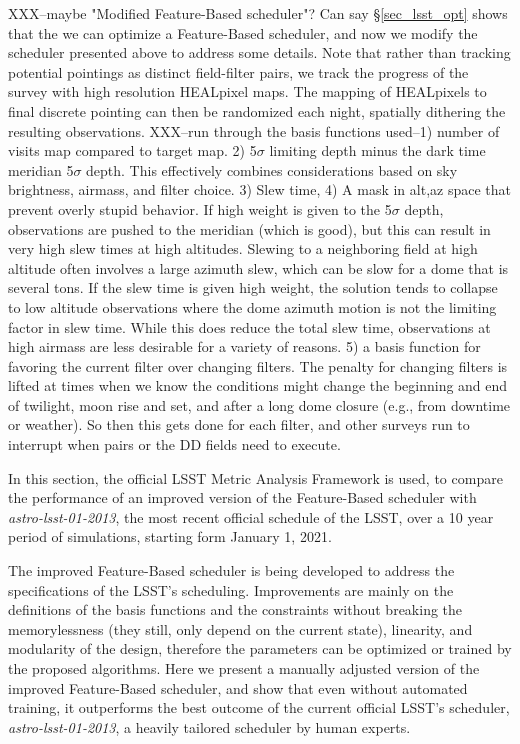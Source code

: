 \documentclass[12pt]{aastex62}
\theoremstyle{definition}
\begin{document}
XXX--maybe "Modified Feature-Based scheduler"? Can say \S\ref{sec_lsst_opt} shows that the we can optimize a Feature-Based scheduler, and now we modify the scheduler presented above to address some details.  Note that rather than tracking potential pointings as distinct field-filter pairs, we track the progress of the survey with high resolution HEALpixel maps. The mapping of HEALpixels to final discrete pointing can then be randomized each night, spatially dithering the resulting observations. 
XXX--run through the basis functions used--1) number of visits map compared to target map. 2) 5$\sigma$ limiting depth minus the dark time meridian 5$\sigma$ depth. This effectively combines considerations based on sky brightness, airmass, and filter choice. 3) Slew time, 4) A mask in alt,az space that prevent overly stupid behavior. If high weight is given to the 5$\sigma$ depth, observations are pushed to the meridian (which is good), but this can result in very high slew times at high altitudes. Slewing to a neighboring field at high altitude often involves a large azimuth slew, which can be slow for a dome that is several tons.  If the slew time is given high weight, the solution tends to collapse to low altitude observations where the dome azimuth motion is not the limiting factor in slew time. While this does reduce the total slew time, observations at high airmass are less desirable for a variety of reasons. 5) a basis function for favoring the current filter over changing filters. The penalty for changing filters is lifted at times when we know the conditions might change the beginning and end of twilight, moon rise and set, and after a long dome closure (e.g., from downtime or weather). So then this gets done for each filter, and other surveys run to interrupt when pairs or the DD fields need to execute.

In this section, the official LSST Metric Analysis Framework \citep{jones2014lsst} is used, to compare the performance of an improved version of the Feature-Based scheduler with \textit{astro-lsst-01-2013}, the most recent official schedule of the LSST, over a 10 year period of simulations, starting form January 1, 2021.

The improved Feature-Based scheduler is being developed to address the specifications of the LSST's scheduling. Improvements are mainly on the definitions of the basis functions and the constraints without breaking the memorylessness (they still, only depend on the current state),  linearity, and modularity of the design, therefore the parameters can be optimized or trained by the proposed algorithms. Here we present a manually adjusted version of the improved Feature-Based scheduler, and show that even without automated training, it outperforms the best outcome of the current official LSST's scheduler, \textit{astro-lsst-01-2013}, a heavily tailored scheduler by human experts. 
\end{document}
